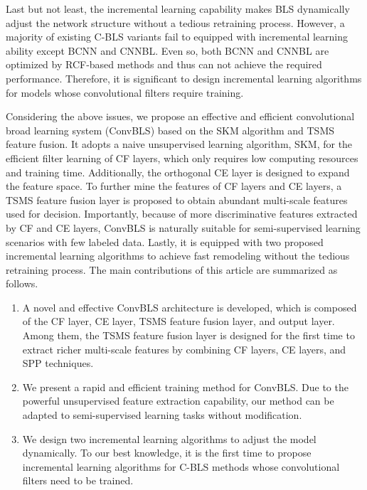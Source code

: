 \documentclass[lettersize,journal]{IEEEtran}
\begin{document}
Last but not least, the incremental learning capability makes BLS dynamically adjust the network structure without a tedious retraining process. However, a majority of existing C-BLS variants \cite{chen2018universal, yang2018cnn, li2019cnn, tang2020combining, ma2021multiscale} fail to equipped with incremental learning ability except BCNN\cite{yu2019broad} and CNNBL\cite{chen2020cnn}. Even so, both BCNN\cite{yu2019broad} and CNNBL\cite{chen2020cnn} are optimized by RCF-based methods and thus can not achieve the required performance. Therefore, it is significant to design incremental learning algorithms for models whose convolutional filters require training.

Considering the above issues, we propose an effective and efficient convolutional broad learning system (ConvBLS) based on the SKM algorithm and TSMS feature fusion. It adopts a naive unsupervised learning algorithm, SKM, for the efficient filter learning of CF layers, which only requires low computing resources and training time. Additionally, the orthogonal CE layer is designed to expand the feature space. To further mine the features of CF layers and CE layers, a TSMS feature fusion layer is proposed to obtain abundant multi-scale features used for decision. Importantly, because of more discriminative features extracted by CF and CE layers, ConvBLS is naturally suitable for semi-supervised learning scenarios with few labeled data. Lastly, it is equipped with two proposed incremental learning algorithms to achieve fast remodeling without the tedious retraining process. The main contributions of this article are summarized as follows.
\begin{enumerate}
    \item A novel and effective ConvBLS architecture is developed, which is composed of the CF layer, CE layer, TSMS feature fusion layer, and output layer. Among them, the TSMS feature fusion layer is designed for the first time to extract richer multi-scale features by combining CF layers, CE layers, and SPP techniques.
    \item We present a rapid and efficient training method for ConvBLS. Due to the powerful unsupervised feature extraction capability, our method can be adapted to semi-supervised learning tasks without modification.
    \item We design two incremental learning algorithms to adjust the model dynamically. To our best knowledge, it is the first time to propose incremental learning algorithms for C-BLS methods whose convolutional filters need to be trained.
\end{enumerate}
\end{document}
